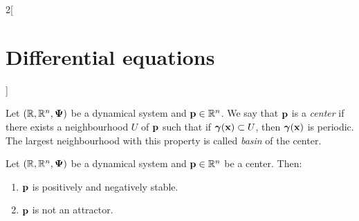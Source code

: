 \documentclass[../../../main.tex]{subfiles}
\begin{document}
\begin{multicols}{2}[\section{Differential equations}]
\begin{definition}
        Let $(\mathbb{R},\mathbb{R}^n,\boldsymbol{\mathrm{\Psi}})$ be a dynamical system and $\boldsymbol{\mathrm{p}}\in\mathbb{R}^n$. We say that $\boldsymbol{\mathrm{p}}$ is a \textit{center} if there exists a neighbourhood $U$ of $\boldsymbol{\mathrm{p}}$ such that if $\boldsymbol{\mathrm{\gamma}}(\boldsymbol{\mathrm{x}})\subset U$, then $\boldsymbol{\mathrm{\gamma}}(\boldsymbol{\mathrm{x}})$ is periodic. The largest neighbourhood with this property is called \textit{basin} of the center.
    \end{definition}
    \begin{prop}
        Let $(\mathbb{R},\mathbb{R}^n,\boldsymbol{\mathrm{\Psi}})$ be a dynamical system and $\boldsymbol{\mathrm{p}}\in\mathbb{R}^n$ be a center. Then:
        \begin{enumerate}
            \item $\boldsymbol{\mathrm{p}}$ is positively and negatively stable.
            \item $\boldsymbol{\mathrm{p}}$ is not an attractor.
        \end{enumerate}
    \end{prop}

\end{multicols}
\end{document}
